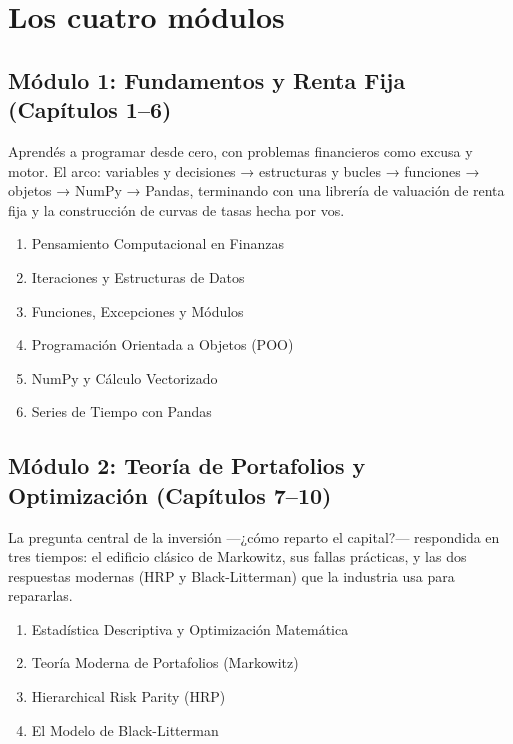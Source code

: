 \documentclass[
  spanish,
  letterpaper,
  DIV=11,
  numbers=noendperiod]{scrreprt}
\providecommand{\tightlist}{%
  \setlength{\itemsep}{0pt}\setlength{\parskip}{0pt}}
\begin{document}
\section*{Los cuatro módulos}\label{los-cuatro-muxf3dulos}


\subsection*{Módulo 1: Fundamentos y Renta Fija (Capítulos
1--6)}\label{muxf3dulo-1-fundamentos-y-renta-fija-capuxedtulos-16}

Aprendés a programar desde cero, con problemas financieros como excusa y
motor. El arco: variables y decisiones → estructuras y bucles →
funciones → objetos → NumPy → Pandas, terminando con una librería de
valuación de renta fija y la construcción de curvas de tasas hecha por
vos.

\begin{enumerate}
\def\labelenumi{\arabic{enumi}.}
\tightlist
\item
  Pensamiento Computacional en Finanzas
\item
  Iteraciones y Estructuras de Datos
\item
  Funciones, Excepciones y Módulos
\item
  Programación Orientada a Objetos (POO)
\item
  NumPy y Cálculo Vectorizado
\item
  Series de Tiempo con Pandas
\end{enumerate}

\subsection*{Módulo 2: Teoría de Portafolios y Optimización (Capítulos
7--10)}\label{muxf3dulo-2-teoruxeda-de-portafolios-y-optimizaciuxf3n-capuxedtulos-710}

La pregunta central de la inversión ---¿cómo reparto el capital?---
respondida en tres tiempos: el edificio clásico de Markowitz, sus fallas
prácticas, y las dos respuestas modernas (HRP y Black-Litterman) que la
industria usa para repararlas.

\begin{enumerate}
\def\labelenumi{\arabic{enumi}.}
\setcounter{enumi}{6}
\tightlist
\item
  Estadística Descriptiva y Optimización Matemática
\item
  Teoría Moderna de Portafolios (Markowitz)
\item
  Hierarchical Risk Parity (HRP)
\item
  El Modelo de Black-Litterman
\end{enumerate}
\end{document}

